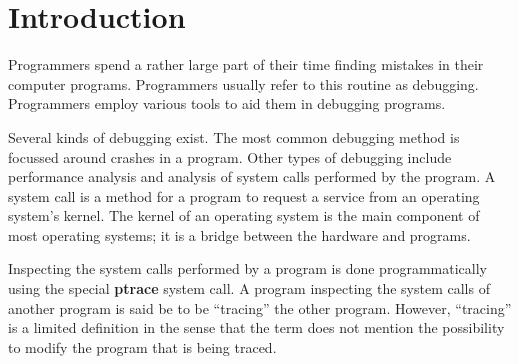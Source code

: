 \documentclass[a4paper, 10pt]{report}
\begin{document}
\chapter{Introduction}

Programmers spend a rather large part of their time finding mistakes in their
computer programs. Programmers usually refer to this routine as debugging.
Programmers employ various tools to aid them in debugging programs.

Several kinds of debugging exist. The most common debugging method is
focussed around crashes in a program. Other types of debugging include
performance analysis and analysis of system calls performed by the program.
A system call is a method for a program to request a service from an operating
system's kernel. The kernel of an operating system is the main component
of most operating systems; it is a bridge between the hardware and programs.


Inspecting the system calls performed by a program is done programmatically
using the special \textbf{ptrace} system call. A program inspecting the
system calls of another program is said be to be ``tracing'' the other
program. However, ``tracing'' is a limited definition in the sense that
the term does not mention the possibility to modify the program that is
being traced.





%
%
%
%
%
%
%
%
%
%
\end{document}
